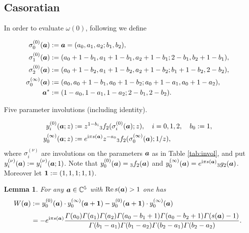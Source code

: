 \documentclass[a4paper,12pt]{article}
\theoremstyle{plain}
\newtheorem{lemma}[theorem]{Lemma}
\def\rRe{\mathrm{Re}}
\def\C{\mathbb{C}}
\def\vG{\varGamma}
\def\ba{\mbox{\boldmath $a$}}
\def\sba{\mbox{\boldmath ${\scriptstyle a}$}}
\def\1{\mbox{\boldmath $1$}}
\begin{document}
\subsection{Casoratian} \label{subsec:casorati} 
In order to evaluate $\omega(0)$, following \cite[formulas (7), (8) and (10)]{EI} 
we define      
\begin{table}
\begin{align*}
\sigma_0^{(0)}(\ba) &:= \ba = (a_0, a_1, a_2; b_1, b_2), \\ 
\sigma_1^{(0)}(\ba) &:= (a_0+1-b_1, a_1+1-b_1, a_2+1-b_1; 2-b_1, b_2+1-b_1), \\
\sigma_2^{(0)}(\ba) &:= (a_0+1-b_2, a_1+1-b_2, a_2+1-b_2; b_1+1-b_2, 2-b_2), \\ 
\sigma_0^{(\infty)}(\ba) &:= (a_0, a_0+1-b_1, a_0+1-b_2; a_0+1-a_1, a_0+1-a_2), \\
\ba^* &:= (1-a_0, 1-a_1, 1-a_2; 2-b_1, 2-b_2). 
\end{align*}
\caption{Five parameter involutions (including identity).}
\label{tab:invol}
\end{table}
\begin{align*}
y_i^{(0)}(\ba; z) &:= z^{1-b_i} {}_3f_2(\sigma_i^{(0)}(\ba); z), \quad i = 0, 1, 2, \quad b_0 := 1,  \\
y_0^{(\infty)}(\ba; z) &:= e^{\mathrm{i} \pi s(\sba)} z^{-a_0}  {}_3f_2(\sigma_0^{(\infty)}(\ba); 1/z), 
\end{align*}
where $\sigma_i^{(\nu)}$ are  involutions on the parameters $\ba$ as in 
Table \ref{tab:invol}, and put $y_i^{(\nu)}(\ba) := y_i^{(\nu)}(\ba; 1)$.   
Note that $y_0^{(0)}(\ba) = {}_3f_2(\ba)$ and $y_0^{(\infty)}(\ba) = 
e^{\mathrm{i} \pi s(\sba)} {}_3g_2(\ba)$. 
Moreover let $\1 := (1,1,1;1,1)$.    
\begin{lemma} \label{lem:wronskian} 
For any $\ba \in \C^5$ with $\rRe \, s(\ba) > 1$ one has   
\begin{equation} \label{eqn:wronskian}
\begin{split}
W(\ba) 
&:= y_0^{(0)}(\ba) \cdot y_0^{(\infty)}(\ba+\1) - y_0^{(0)}(\ba+\1) \cdot y_0^{(\infty)}(\ba) 
\\[1mm]
&= - e^{\mathrm{i} \pi s(\sba)} 
\dfrac{\vG(a_0) \vG(a_1) \vG(a_2) \vG(a_0-b_1+1) \vG(a_0-b_2+1) 
\vG(s(\ba)-1)}{\vG(b_1-a_1) \vG(b_1-a_2) \vG(b_2-a_1) \vG(b_2-a_2)}.  
\end{split}
\end{equation}
\end{lemma}
\end{document}
